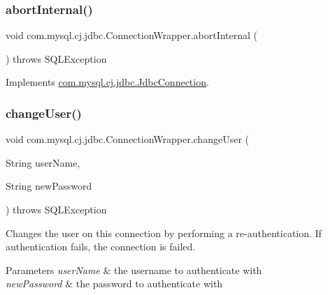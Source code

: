 \mbox{\label{classcom_1_1mysql_1_1cj_1_1jdbc_1_1_connection_wrapper_a215a9344c2e91576f7df2df642111b50}} 
\subsubsection{\texorpdfstring{abort\+Internal()}{abortInternal()}}
{\footnotesize\ttfamily void com.\+mysql.\+cj.\+jdbc.\+Connection\+Wrapper.\+abort\+Internal (\begin{DoxyParamCaption}{ }\end{DoxyParamCaption}) throws S\+Q\+L\+Exception}



Implements \mbox{\hyperlink{interfacecom_1_1mysql_1_1cj_1_1jdbc_1_1_jdbc_connection_afc07faaedcdfc3be9fa9bfcf751b673a}{com.\+mysql.\+cj.\+jdbc.\+Jdbc\+Connection}}.

\mbox{\label{classcom_1_1mysql_1_1cj_1_1jdbc_1_1_connection_wrapper_a326d50e31598342bcc2c4273967f3020}} 
\subsubsection{\texorpdfstring{change\+User()}{changeUser()}}
{\footnotesize\ttfamily void com.\+mysql.\+cj.\+jdbc.\+Connection\+Wrapper.\+change\+User (\begin{DoxyParamCaption}\item[{String}]{user\+Name,  }\item[{String}]{new\+Password }\end{DoxyParamCaption}) throws S\+Q\+L\+Exception}

Changes the user on this connection by performing a re-\/authentication. If authentication fails, the connection is failed.


\begin{DoxyParams}{Parameters}
{\em user\+Name} & the username to authenticate with \\
\hline
{\em new\+Password} & the password to authenticate with \\
\hline
\end{DoxyParams}

